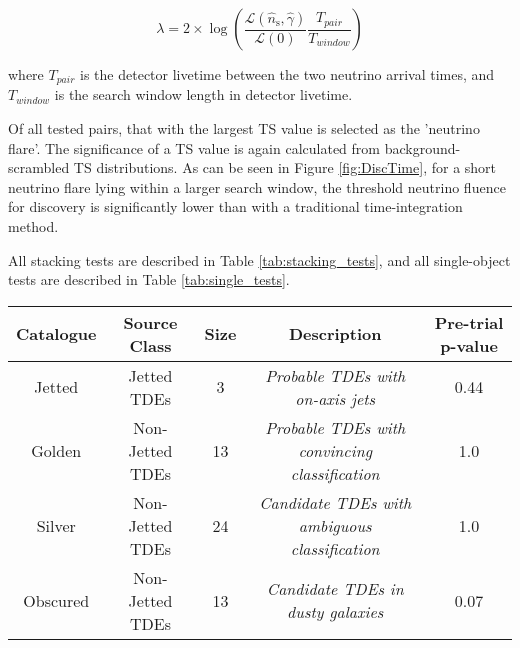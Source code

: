 \begin{equation*}
	\lambda = 2\times \log \left( \frac{\mathcal{L}(\hat{n}_\text{s}, \hat{\gamma})}{\mathcal{L}(0)} \frac{T_{pair}}{T_{window}}\right)
\end{equation*}

where $T_{pair}$ is the detector livetime between the two neutrino arrival times, and $T_{window}$ is the search window length in detector livetime.

Of all tested pairs, that with the largest TS value is selected as the 'neutrino flare'. The significance of a TS value is again calculated from background-scrambled TS distributions. As can be seen in Figure \ref{fig:DiscTime}, for a short neutrino flare lying within a larger search window, the threshold neutrino fluence for discovery is significantly lower than with a traditional time-integration method.

All stacking tests are described in Table \ref{tab:stacking_tests}, and all single-object tests are described in Table \ref{tab:single_tests}.

\begin{table*}[]
	\centering
	\begin{tabular}{||c c c c | c||} 
		\hline
		Catalogue & Source Class & Size & Description  & Pre-trial p-value\\ [0.5ex] 
		\hline\hline
		Jetted & Jetted TDEs &  3 & \textit{Probable TDEs with on-axis jets} & 0.44\\ 
		\hline
		Golden & Non-Jetted TDEs & 13 & \textit{Probable TDEs with convincing classification}&1.0\\
		\hline
		Silver & Non-Jetted TDEs & 24 & \textit{Candidate TDEs with ambiguous classification}&1.0\\
		\hline
		Obscured & Non-Jetted TDEs & 13 & \textit{Candidate TDEs in dusty galaxies}&0.07\\[1ex] 
		\hline
	\end{tabular}
	\caption{Summary of the four TDE catalogues. For each, an independent stacking analysis was performed. The catalogues covered sources from May 2008 to October 2017, matching the IceCube data-taking period.}
	\label{tab:stacking_tests}
\end{table*}{}

